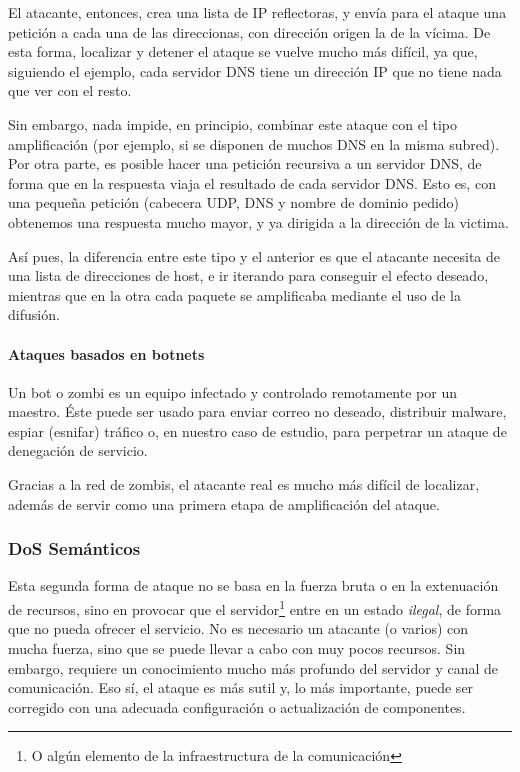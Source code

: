 El atacante, entonces, crea una lista de IP reflectoras, y envía para el ataque una petición a cada una de las 
direccionas, con dirección origen la de la vícima. De esta forma, localizar y detener el ataque se vuelve mucho más 
difícil, ya que, siguiendo el ejemplo, cada servidor \gls{DNS} tiene un dirección IP que no tiene nada que ver con el resto.

Sin embargo, nada impide, en principio, combinar este ataque con el tipo amplificación (por ejemplo, si se 
disponen de muchos \gls{DNS} en la misma subred). Por otra parte, es posible hacer una petición recursiva a un servidor \gls{DNS}, 
de forma que en la respuesta viaja el resultado de cada servidor \gls{DNS}. Esto es, con una pequeña petición (cabecera \gls{UDP}, 
\gls{DNS} y nombre de dominio pedido) obtenemos una respuesta mucho mayor, y ya dirigida a la dirección de la victima. 

Así pues, la diferencia entre este tipo y el anterior es que el atacante necesita de una lista de direcciones de host, 
e ir iterando para conseguir el efecto deseado, mientras que en la otra cada paquete se amplificaba mediante el uso de 
la difusión.

\paragraph{Ataques basados en botnets}\mbox{\newline}

\noindent Un bot o zombi es un equipo infectado y controlado remotamente por un maestro. Éste puede ser usado para 
enviar correo no deseado, distribuir malware, espiar (esnifar) tráfico o, en nuestro caso de 
estudio, para perpetrar un ataque de denegación de servicio. 

Gracias a la red de zombis, el atacante real es mucho más difícil de localizar, además de servir como una primera etapa 
de amplificación del ataque.

\subsubsection{DoS Semánticos}
Esta segunda forma de ataque no se basa en la fuerza bruta o en la extenuación de recursos, sino en 
provocar que el servidor\footnote{O algún elemento de la infraestructura de la comunicación} entre en un estado 
\emph{ilegal}, de forma que no pueda ofrecer el servicio. No es necesario un atacante (o varios) con mucha fuerza, sino 
que se puede llevar a cabo con muy pocos recursos. Sin embargo, requiere un conocimiento mucho más profundo del 
servidor y canal de comunicación. Eso sí, el ataque es más sutil y, lo más importante, puede ser corregido con una 
adecuada configuración o actualización de componentes.
 

